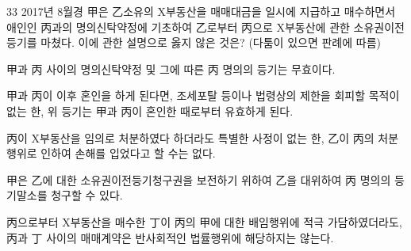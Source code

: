 \begin{question}{33}
2017년 8월경 甲은 乙소유의 X부동산을 매매대금을 일시에 지급하고 매수하면서 애인인 丙과의 명의신탁약정에 기초하여 乙로부터 丙으로 X부동산에 관한 소유권이전등기를 마쳤다. 이에 관한 설명으로 옳지 않은 것은? (다툼이 있으면 판례에 따름)
\begin{choices}
  \item 甲과 丙 사이의 명의신탁약정 및 그에 따른 丙 명의의 등기는 무효이다.
  \item 甲과 丙이 이후 혼인을 하게 된다면, 조세포탈 등이나 법령상의 제한을 회피할 목적이 없는 한, 위 등기는 甲과 丙이 혼인한 때로부터 유효하게 된다.
  \item 丙이 X부동산을 임의로 처분하였다 하더라도 특별한 사정이 없는 한, 乙이 丙의 처분행위로 인하여 손해를 입었다고 할 수는 없다.
  \item 甲은 乙에 대한 소유권이전등기청구권을 보전하기 위하여 乙을 대위하여 丙 명의의 등기말소를 청구할 수 있다.
  \item 丙으로부터 X부동산을 매수한 丁이 丙의 甲에 대한 배임행위에 적극 가담하였더라도, 丙과 丁 사이의 매매계약은 반사회적인 법률행위에 해당하지는 않는다.
\end{choices}
\end{question}
